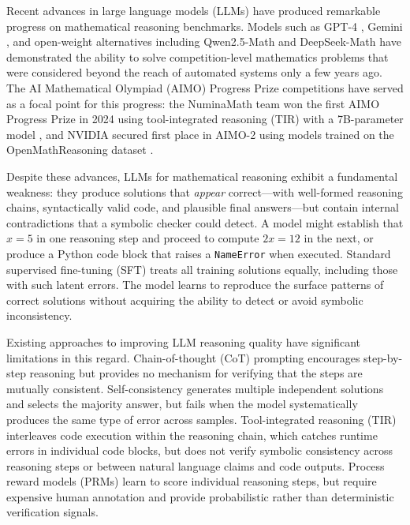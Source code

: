\documentclass[11pt,a4paper]{article}
\begin{document}
Recent advances in large language models (LLMs) have produced remarkable
progress on mathematical reasoning benchmarks. Models such as GPT-4
\citep{openai2023gpt4}, Gemini \citep{google2024gemini}, and open-weight
alternatives including Qwen2.5-Math \citep{yang2024qwen25math} and
DeepSeek-Math \citep{shao2024deepseekmath} have demonstrated the ability to
solve competition-level mathematics problems that were considered beyond the
reach of automated systems only a few years ago. The AI Mathematical Olympiad
(AIMO) Progress Prize competitions have served as a focal point for this
progress: the NuminaMath team won the first AIMO Progress Prize in 2024 using
tool-integrated reasoning (TIR) with a 7B-parameter model
\citep{numina2024winning}, and NVIDIA secured first place in AIMO-2 using
models trained on the OpenMathReasoning dataset \citep{moshkov2025aimo2}.

Despite these advances, LLMs for mathematical reasoning exhibit a fundamental
weakness: they produce solutions that \emph{appear} correct---with well-formed
reasoning chains, syntactically valid code, and plausible final answers---but
contain internal contradictions that a symbolic checker could detect. A model
might establish that $x = 5$ in one reasoning step and proceed to compute
$2x = 12$ in the next, or produce a Python code block that raises a
\texttt{NameError} when executed. Standard supervised fine-tuning (SFT) treats
all training solutions equally, including those with such latent errors. The
model learns to reproduce the surface patterns of correct solutions without
acquiring the ability to detect or avoid symbolic inconsistency.

Existing approaches to improving LLM reasoning quality have significant
limitations in this regard. Chain-of-thought (CoT) prompting
\citep{wei2022chain} encourages step-by-step reasoning but provides no mechanism
for verifying that the steps are mutually consistent. Self-consistency
\citep{wang2023selfconsistency} generates multiple independent solutions and
selects the majority answer, but fails when the model systematically produces
the same type of error across samples. Tool-integrated reasoning (TIR)
\citep{numina2024winning} interleaves code execution within the reasoning
chain, which catches runtime errors in individual code blocks, but does not
verify symbolic consistency across reasoning steps or between natural language
claims and code outputs. Process reward models (PRMs)
\citep{lightman2023lets} learn to score individual reasoning steps, but require
expensive human annotation and provide probabilistic rather than deterministic
verification signals.
\end{document}

